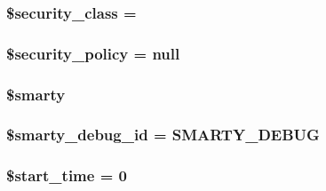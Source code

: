 \subsubsection[{\$security\+\_\+class}]{\setlength{\rightskip}{0pt plus 5cm}\$security\+\_\+class = \textquotesingle{}}\label{class_smarty_a678d027f0022db4a62539937fdf18a0f}
\hypertarget{class_smarty_a5268d7432b4de885ac265721a56fba85}{}
\subsubsection[{\$security\+\_\+policy}]{\setlength{\rightskip}{0pt plus 5cm}\$security\+\_\+policy = null}\label{class_smarty_a5268d7432b4de885ac265721a56fba85}
\hypertarget{class_smarty_ac3ae29e9ccbb2006fa26fd9eb2c12117}{}
\subsubsection[{\$smarty}]{\setlength{\rightskip}{0pt plus 5cm}\$smarty}\label{class_smarty_ac3ae29e9ccbb2006fa26fd9eb2c12117}
\hypertarget{class_smarty_a1936345582d4483c652b90bbf7a51cbc}{}
\subsubsection[{\$smarty\+\_\+debug\+\_\+id}]{\setlength{\rightskip}{0pt plus 5cm}\$smarty\+\_\+debug\+\_\+id = \textquotesingle{}S\+M\+A\+R\+T\+Y\+\_\+\+D\+E\+B\+U\+G\textquotesingle{}}\label{class_smarty_a1936345582d4483c652b90bbf7a51cbc}
\hypertarget{class_smarty_a73a034a7a0fbdd2c93f23fb6c9946ee9}{}
\subsubsection[{\$start\+\_\+time}]{\setlength{\rightskip}{0pt plus 5cm}\$start\+\_\+time = 0}\label{class_smarty_a73a034a7a0fbdd2c93f23fb6c9946ee9}
\hypertarget{class_smarty_a2c096c8e6fc6d2febe1fee59c6e924f8}{}
